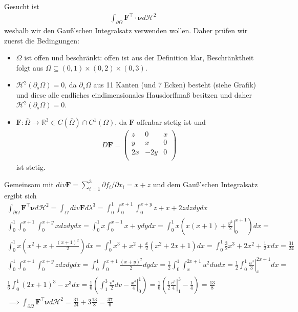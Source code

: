 \documentclass[]{article}
\begin{document}
Gesucht ist
\begin{align*}
	\int_{\partial \Omega} \bm{F}^\top \cdot \bm{\nu} d\mathcal{H}^2
\end{align*}
weshalb wir den Gauß'schen Integralsatz verwenden wollen. Daher prüfen wir zuerst die Bedingungen:
\begin{itemize}
	\item $\Omega$ ist offen und beschränkt: offen ist aus der Definition klar, Beschränktheit folgt aus $\Omega \subseteq (0,1)\times(0,2)\times(0,3)$.
	\item $\mathcal{H}^2(\partial_s\Omega) = 0$, da $\partial_s\Omega$ aus 11 Kanten (und 7 Ecken) besteht (siehe Grafik) und diese alle endliches eindimensionales Hausdorffmaß besitzen und daher $\mathcal{H}^2(\partial_s\Omega) = 0$.
	\item $\bm{F}:\overline{\Omega} \rightarrow \mathbb{R}^3 \in C(\overline{\Omega}) \cap C^1(\Omega)$, da $\bm{F}$ offenbar stetig ist und
	\begin{align*}
		D\bm{F} = \begin{pmatrix}
			z & 0 & x\\ y & x & 0\\ 2x & -2y & 0\\
		\end{pmatrix}
	\end{align*}
	ist stetig.
\end{itemize}

Gemeinsam mit $div\bm{F} = \sum_{i=1}^{3} \partial f_i / \partial x_i = x+z$ und dem Gauß'schen Integralsatz ergibt sich
\begin{align*}
	\int_{\partial\Omega} \bm{F}^\top \bm{\nu} d\mathcal{H}^2 = \int_\Omega div\bm{F} d\lambda^3 = \int_0^1 \int_0^{x+1} \int_0^{x+y} z+x+2z dzdydx\\
	\int_0^1 \int_0^{x+1} \int_0^{x+y} x dzdydx = \int_0^1 x \int_0^{x+1} x+y dy dx = \int_0^1 x\left(x(x+1) + \left.\frac{y^2}{2}\right\vert_0^{x+1}\right) dx =\\
	\int_0^1 x \left(x^2+x + \frac{(x+1)^2}{2}\right) dx = \int_0^1 x^3 + x^2 + \frac{x}{2} (x^2+2x+1) dx = \int_0^1 \frac{3}{2} x^3 + 2 x^2 + \frac{1}{2} x dx = \frac{31}{24}\\
	\int_0^1 \int_0^{x+1} \int_0^{x+y} z dzdydx = \int_0^1 \int_0^{x+1} \frac{(x+y)^2}{2} dy dx = \frac{1}{2} \int_0^1 \int_x^{2x+1} u^2 du dx = \frac{1}{2} \int_0^1 \left.\frac{u^3}{3}\right\vert_x^{2x+1} dx =\\
	\frac{1}{6} \int_0^1 (2x+1)^3 - x^3 dx = \frac{1}{6} \left(\int_1^3 \frac{v^3}{2} dv - \left. \frac{x^4}{4}\right\vert_0^1\right) = \frac{1}{6} \left(\frac{1}{2} \left.\frac{v^3}{4}\right\vert_1^3 - \frac{1}{4}\right) = \frac{13}{8}\\
	\implies \int_{\partial\Omega} \bm{F}^\top \bm{\nu} d\mathcal{H}^2 = \frac{31}{24} + 3\frac{13}{8} = \frac{37}{6}
\end{align*}
\newpage
\end{document}
